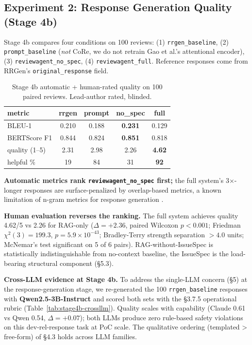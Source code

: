 \documentclass[sigconf, nonacm, anonymous, balance=false]{acmart}
\begin{document}
\subsection{Experiment 2: Response Generation Quality (Stage 4b)}\label{experiment-2-response-generation-quality-stage-4b}

Stage 4b compares four conditions on 100 reviews: (1) \texttt{rrgen\_baseline}, (2) \texttt{prompt\_baseline} (\emph{not} CoRe, we do not retrain Gao et al.'s attentional encoder), (3) \texttt{reviewagent\_no\_spec}, (4) \texttt{reviewagent\_full}. Reference responses come from RRGen's \texttt{original\_response} field.

\begin{table}[t]\centering\footnotesize\setlength{\tabcolsep}{2pt}
\caption{Stage 4b automatic + human-rated quality on 100 paired reviews. Lead-author rated, blinded.}\label{tab:stage4b}
\begin{tabular}{lcccc}\toprule
metric & rrgen & prompt & no\_spec & \textbf{full} \\\midrule
BLEU-1 & 0.210 & 0.188 & \textbf{0.231} & 0.129 \\
BERTScore F1 & 0.844 & 0.824 & \textbf{0.851} & 0.818 \\
quality (1--5) & 2.31 & 2.98 & 2.26 & \textbf{4.62} \\
helpful \% & 19 & 84 & 31 & \textbf{92} \\\bottomrule
\end{tabular}\end{table}

\textbf{Automatic metrics rank \texttt{reviewagent\_no\_spec} first;} the full system's 3$\times$-longer responses are surface-penalized by overlap-based metrics, a known limitation of n-gram metrics for response generation \cite{liu2016how, sai2022survey}.

\textbf{Human evaluation reverses the ranking.} The full system achieves quality 4.62/5 vs 2.26 for RAG-only ($\Delta = +2.36$, paired Wilcoxon $p < 0.001$; Friedman $\chi^2(3) = 199.3$, $p = 5.9 \times 10^{-43}$; Bradley-Terry strength separation $> 4.0$ units; McNemar's test significant on 5 of 6 pairs). RAG-without-IssueSpec is statistically indistinguishable from no-context baseline, the IssueSpec is the load-bearing structural component (\S5.3).



\textbf{Cross-LLM evidence at Stage 4b.} To address the single-LLM concern (§5) at the response-generation stage, we re-generated the 100 \texttt{rrgen\_baseline} responses with \textbf{Qwen2.5-3B-Instruct} \cite{yang2024qwen2_5} and scored both sets with the §3.7.5 operational rubric (Table~\ref{tab:stage4b-crossllm}). Quality scales with capability (Claude 0.61 vs Qwen 0.54, $\Delta = +0.07$); both LLMs produce zero rule-based safety violations on this dev-rel-response task at PoC scale. The qualitative ordering (templated > free-form) of §4.3 holds across LLM families.
\end{document}
